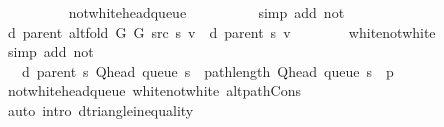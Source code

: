 \begin{isabellebody}
\ \ \ \ \ \ \ \ \isamarkupfalse%
\ not{\isacharunderscore}{\kern0pt}white{\isacharunderscore}{\kern0pt}head{\isacharunderscore}{\kern0pt}queue\isanewline
\ \ \ \ \ \ \ \ \isamarkupfalse%
\ {\isacharparenleft}{\kern0pt}simp\ add{\isacharcolon}{\kern0pt}\ not{\isacharunderscore}{\kern0pt}{\isacharparenleft}{\kern0pt}{}{\isacharparenright}{\kern0pt}{\isacharparenright}{\kern0pt}\isanewline
\ \ \ \ \isamarkupfalse%
\isanewline
\ \ \ \ \isanewline
\ \ \ \ \isamarkupfalse%
\ {\isachardoublequoteopen}d\ {\isacharparenleft}{\kern0pt}parent\ {\isacharparenleft}{\kern0pt}alt{\isacharunderscore}{\kern0pt}fold\ G{}\ G{}\ src\ s{\isacharparenright}{\kern0pt}{\isacharparenright}{\kern0pt}\ v\ {\isacharequal}{\kern0pt}\ d\ {\isacharparenleft}{\kern0pt}parent\ s{\isacharparenright}{\kern0pt}\ v{\isachardoublequoteclose}\isanewline
\ \ \ \ \ \ \isamarkupfalse%
\ white{\isacharunderscore}{\kern0pt}not{\isacharunderscore}{\kern0pt}white\isanewline
\ \ \ \ \ \ \isamarkupfalse%
\ {\isacharparenleft}{\kern0pt}simp\ add{\isacharcolon}{\kern0pt}\ not{\isacharunderscore}{\kern0pt}{\isacharparenleft}{\kern0pt}{}{\isacharparenright}{\kern0pt}{\isacharparenright}{\kern0pt}\isanewline
\ \ \ \ \isamarkupfalse%
\ \isamarkupfalse%
\ {\isachardoublequoteopen}{\isachardot}{\kern0pt}{\isachardot}{\kern0pt}{\isachardot}{\kern0pt}\ {\isasymle}\ d\ {\isacharparenleft}{\kern0pt}parent\ s{\isacharparenright}{\kern0pt}\ {\isacharparenleft}{\kern0pt}Q{\isacharunderscore}{\kern0pt}head\ {\isacharparenleft}{\kern0pt}queue\ s{\isacharparenright}{\kern0pt}{\isacharparenright}{\kern0pt}\ {\isacharplus}{\kern0pt}\ path{\isacharunderscore}{\kern0pt}length\ {\isacharparenleft}{\kern0pt}Q{\isacharunderscore}{\kern0pt}head\ {\isacharparenleft}{\kern0pt}queue\ s{\isacharparenright}{\kern0pt}\ {\isacharhash}{\kern0pt}\ p{\isacharparenright}{\kern0pt}{\isachardoublequoteclose}\isanewline
\ \ \ \ \ \ \isamarkupfalse%
\ not{\isacharunderscore}{\kern0pt}white{\isacharunderscore}{\kern0pt}head{\isacharunderscore}{\kern0pt}queue\ white{\isacharunderscore}{\kern0pt}not{\isacharunderscore}{\kern0pt}white\ alt{\isacharunderscore}{\kern0pt}path{\isacharunderscore}{\kern0pt}Cons\isanewline
\ \ \ \ \ \ \isamarkupfalse%
\ {\isacharparenleft}{\kern0pt}auto\ intro{\isacharcolon}{\kern0pt}\ d{\isacharunderscore}{\kern0pt}triangle{\isacharunderscore}{\kern0pt}inequality{\isacharparenright}{\kern0pt}\isanewline
\ \ \ \ \isamarkupfalse%

\end{isabellebody}
